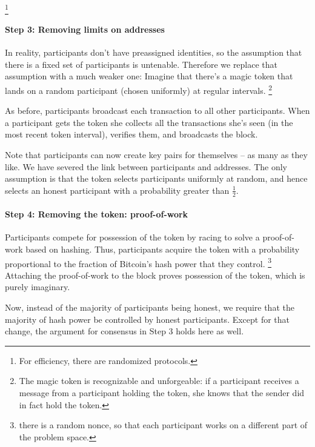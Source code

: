 \footnote{For efficiency, there are randomized protocols.}

\paragraph{Step 3: Removing limits on addresses}

In reality, participants don’t have preassigned identities, so the assumption that there is a fixed set of participants is untenable. Therefore we replace that assumption with a much weaker one: Imagine that there’s a magic token that lands on a random participant (chosen uniformly) at regular intervals. \footnote{The magic token is recognizable and unforgeable: if a participant receives a message from a participant holding the token, she knows that the sender did in fact hold the token.}

As before, participants broadcast each transaction to all other participants. When a participant gets the token she collects all the transactions she’s seen (in the most recent token interval), verifies them, and broadcasts the block.


Note that participants can now create key pairs for themselves -- as many as they like. We have severed the link between participants and addresses. The only assumption is that the token selects participants uniformly at random, and hence selects an honest participant with a probability greater than $\frac{1}{2}$.

\paragraph{Step 4: Removing the token: proof-of-work}

Participants compete for possession of the token by racing to solve a proof-of-work based on hashing. Thus, participants acquire the token with a probability proportional to the fraction of Bitcoin’s hash power that they control. \footnote{there is a random nonce, so that each participant works on a different part of the problem space.} Attaching the proof-of-work to the block proves possession of the token, which is purely imaginary.

Now, instead of the majority of participants being honest, we require that the majority of hash power be controlled by honest participants. Except for that change, the argument for consensus in Step 3 holds here as well.

